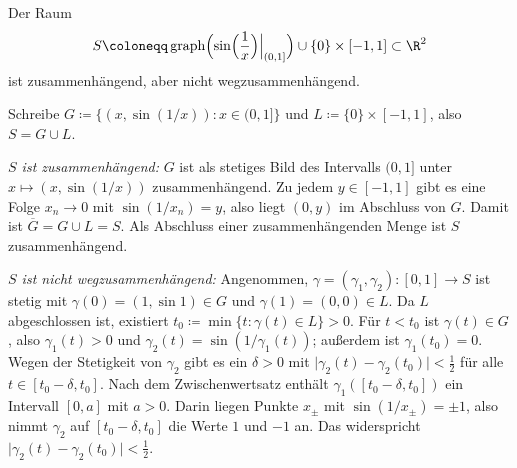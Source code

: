 \documentclass[11pt]{article}
\begin{document}
\begin{example}
  Der Raum
  \[ S \coloneqq \operatorname{graph}\Bigl(\sin\Bigl(\frac{1}{x}\Bigr)\Big|_{(0, 1]}\Bigr) \cup \{0\} \times [-1, 1] \subset \R^2 \]
  ist zusammenhängend, aber nicht wegzusammenhängend.
\begin{ergaenzung}
  Schreibe $G \coloneqq \{(x, \sin(1/x)) : x \in (0, 1]\}$ und $L \coloneqq \{0\} \times [-1, 1]$, also $S = G \cup L$.

  \textit{$S$ ist zusammenhängend:} $G$ ist als stetiges Bild des Intervalls $(0, 1]$ unter $x \mapsto (x, \sin(1/x))$ zusammenhängend. Zu jedem $y \in [-1, 1]$ gibt es eine Folge $x_n \to 0$ mit $\sin(1/x_n) = y$, also liegt $(0, y)$ im Abschluss von $G$. Damit ist $\overline{G} = G \cup L = S$. Als Abschluss einer zusammenhängenden Menge ist $S$ zusammenhängend.

  \textit{$S$ ist nicht wegzusammenhängend:} Angenommen, $\gamma = (\gamma_1, \gamma_2)\colon [0, 1] \to S$ ist stetig mit $\gamma(0) = (1, \sin 1) \in G$ und $\gamma(1) = (0, 0) \in L$. Da $L$ abgeschlossen ist, existiert $t_0 \coloneqq \min\{t : \gamma(t) \in L\} > 0$. Für $t < t_0$ ist $\gamma(t) \in G$, also $\gamma_1(t) > 0$ und $\gamma_2(t) = \sin(1/\gamma_1(t))$; außerdem ist $\gamma_1(t_0) = 0$.
  Wegen der Stetigkeit von $\gamma_2$ gibt es ein $\delta > 0$ mit $\lvert \gamma_2(t) - \gamma_2(t_0) \rvert < \frac{1}{2}$ für alle $t \in [t_0 - \delta, t_0]$.
  Nach dem Zwischenwertsatz enthält $\gamma_1([t_0 - \delta, t_0])$ ein Intervall $[0, a]$ mit $a > 0$. Darin liegen Punkte $x_\pm$ mit $\sin(1/x_\pm) = \pm 1$, also nimmt $\gamma_2$ auf $[t_0 - \delta, t_0]$ die Werte $1$ und $-1$ an. Das widerspricht $\lvert \gamma_2(t) - \gamma_2(t_0) \rvert < \frac{1}{2}$.

  \begin{center}
  \end{center}
  \end{ergaenzung}
\end{example}
\end{document}
